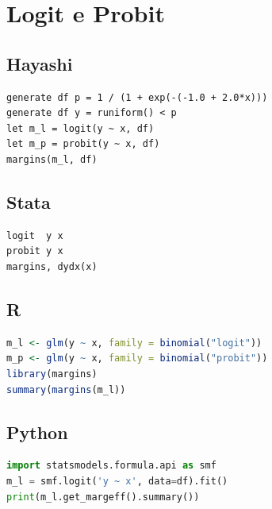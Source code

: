 \section{Logit e Probit}

\subsection*{Hayashi}

\begin{lstlisting}
generate df p = 1 / (1 + exp(-(-1.0 + 2.0*x)))
generate df y = runiform() < p
let m_l = logit(y ~ x, df)
let m_p = probit(y ~ x, df)
margins(m_l, df)
\end{lstlisting}

\subsection*{Stata}

\begin{lstlisting}[language={}, basicstyle=\ttfamily\small,
  frame=single, numbers=none, backgroundcolor=\color{codbg}]
logit  y x
probit y x
margins, dydx(x)
\end{lstlisting}

\subsection*{R}

\begin{lstlisting}[language=R, basicstyle=\ttfamily\small,
  frame=single, numbers=none, backgroundcolor=\color{codbg},
  keywordstyle=\color{keyword}\bfseries,
  stringstyle=\color{string},
  commentstyle=\color{comment}\itshape]
m_l <- glm(y ~ x, family = binomial("logit"))
m_p <- glm(y ~ x, family = binomial("probit"))
library(margins)
summary(margins(m_l))
\end{lstlisting}

\subsection*{Python}

\begin{lstlisting}[language=Python, basicstyle=\ttfamily\small,
  frame=single, numbers=none, backgroundcolor=\color{codbg},
  keywordstyle=\color{keyword}\bfseries,
  stringstyle=\color{string},
  commentstyle=\color{comment}\itshape]
import statsmodels.formula.api as smf
m_l = smf.logit('y ~ x', data=df).fit()
print(m_l.get_margeff().summary())
\end{lstlisting}

